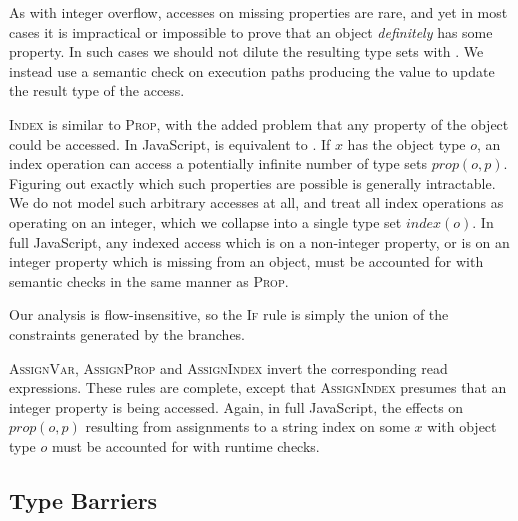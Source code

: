 As with integer overflow, accesses on missing properties are rare,
and yet in most cases it is impractical or impossible to prove that an object
\emph{definitely} has some property. In such cases we should not dilute the
resulting type sets with . We instead use a semantic check
on execution paths producing the  value to update the
result type of the access.

\textsc{Index} is similar to \textsc{Prop}, with the added problem that any
property of the object could be accessed.  In JavaScript,  is
equivalent to . If $x$ has the object type $o$, an index operation
can access a potentially infinite number of type sets $\mathit{prop}(o,p)$.
Figuring out exactly which such properties are possible is generally
intractable. We do not model such arbitrary accesses at all, and treat
all index operations as operating on an integer,
 which we collapse into a single type set
$\mathit{index}(o)$.  In full JavaScript, any indexed access which is on a
non-integer property, or is on an integer property which is missing from an
object, must be accounted for with semantic checks in the same manner as
\textsc{Prop}.

Our analysis is flow-insensitive, so the \textsc{If} rule is simply the union
of the constraints generated by the branches.

\textsc{AssignVar}, \textsc{AssignProp} and \textsc{AssignIndex} invert the
corresponding read expressions.  These rules are complete, except that
\textsc{AssignIndex} presumes that an integer property is being accessed.
Again, in full JavaScript, the effects on $\mathit{prop}(o,p)$ resulting from
assignments to a string index  on some $x$ with object type $o$
must be accounted for with runtime checks.



\subsection{Type Barriers}
\label{sec:barriers}

